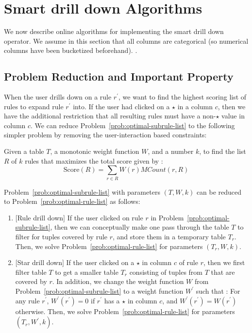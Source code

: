 

\section{Smart drill down Algorithms} \label{sec:algorithms}
We now describe online algorithms for implementing
the smart drill down operator. We assume in this section that all columns are categorical (so numerical columns have been bucketized beforehand). .


\subsection{Problem Reduction and Important Property} \label{sec:reduction}
When the user drills down on a rule $r^{\prime}$, we want to find the highest scoring list of rules to expand rule $r^{\prime}$ into. If the user had clicked on a $\star$ in a column $c$, then we have the additional restriction that all resulting rules must have a non-$\star$ value in column $c$. We can reduce Problem~\ref{prob:optimal-subrule-list} to the following simpler problem by removing the user-interaction based constraints: 

\begin{problem}\label{prob:optimal-rule-list}
Given a table $T$, a monotonic weight function $W$, and a number $k$, to find the list $R$ of $k$ rules that maximizes the total score given by :
$$\text{Score}(R) = \sum_{r \in R}W(r)MCount(r,R)$$
\end{problem}

\noindent Problem~\ref{prob:optimal-subrule-list} with parameters $(T, W, k)$ can be reduced to Problem~\ref{prob:optimal-rule-list} as follows:
\begin{enumerate}
\item $[$Rule drill down$]$ If the user clicked on rule $r$ in Problem~\ref{prob:optimal-subrule-list}, then we can conceptually make one pass through the table $T$ to filter for tuples covered by rule $r$, and store them in a temporary table $T_r$. Then, we solve Problem~\ref{prob:optimal-rule-list} for parameters $(T_r, W, k)$.
\item $[$Star drill down$]$ If the user clicked on a $\star$ in column $c$ of rule $r$, then we first filter table $T$ to get a smaller table $T_r$ consisting of tuples from $T$ that are covered by $r$. In addition, we change the weight function $W$ from Problem~\ref{prob:optimal-subrule-list} to a weight function $W^{\prime}$ such that : For any rule $r^{\prime}$, $W^{\prime}(r^{\prime}) = 0$ if $r^{\prime}$ has a $\star$ in column $c$, and $W^{\prime}(r^{\prime}) = W(r^{\prime})$ otherwise. Then, we solve Problem~\ref{prob:optimal-rule-list} for parameters $(T_r, W^{\prime}, k)$.
\end{enumerate}

